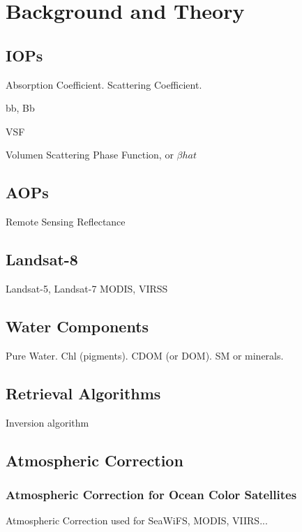\chapter{Background and Theory}
\label{ch:background}
\section{IOPs}

Absorption Coefficient.
Scattering Coefficient.

bb, Bb

VSF

Volumen Scattering Phase Function, or $\beta{hat}$ 
\section{AOPs}
Remote Sensing Reflectance
\section{Landsat-8}
Landsat-5, Landsat-7
MODIS, VIRSS
\section{Water Components}
Pure Water. Chl (pigments). CDOM (or DOM). SM or minerals.
\section{Retrieval Algorithms}
Inversion algorithm 
\section{Atmospheric Correction}
\subsection{Atmospheric Correction for Ocean Color Satellites}
Atmospheric Correction used for SeaWiFS, MODIS, VIIRS...

